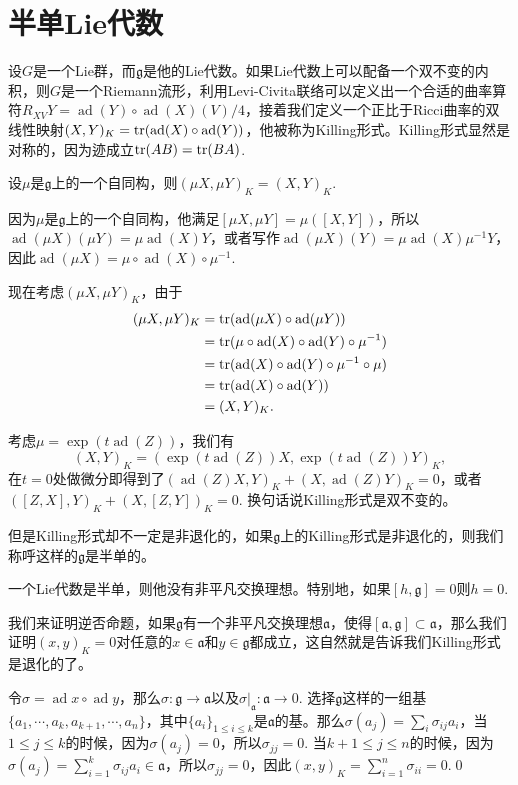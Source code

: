 \documentclass[9pt]{extarticle}
\newcommand{\lag}{{\mathfrak{g}}}
\DeclareMathOperator{\ad}{ad}
\begin{document}
\section{半单Lie代数}

\para 设$G$是一个Lie群，而$\lag$是他的Lie代数。如果Lie代数上可以配备一个双不变的内积，则$G$是一个Riemann流形，利用Levi-Civita联络可以定义出一个合适的曲率算符$R_{XV}Y=\ad(Y)\circ \ad(X)(V)/4$，接着我们定义一个正比于Ricci曲率的双线性映射$(X,Y)_K=\tr(\ad(X)\circ \ad(Y))$，他被称为Killing形式。Killing形式显然是对称的，因为迹成立$\operatorname{tr}(AB)=\operatorname{tr}(BA)$.

\para 设$\mu$是$\lag$上的一个自同构，则$(\mu X,\mu Y)_K=(X,Y)_K$.

因为$\mu$是$\lag$上的一个自同构，他满足$[\mu X,\mu Y]=\mu([X,Y])$，所以$\ad(\mu X)(\mu Y)=\mu\ad(X)Y$，或者写作$\ad(\mu X)(Y)=\mu\ad(X)\mu^{-1}Y$，因此$\ad(\mu X)=\mu\circ \ad(X)\circ \mu^{-1}$. 

现在考虑$(\mu X,\mu Y)_K$，由于
\begin{align*}
	(\mu X,\mu Y)_K&=\tr(\ad(\mu X)\circ \ad(\mu Y))\\
	&=\tr(\mu\circ \ad(X)\circ \ad(Y)\circ \mu^{-1})\\&=\tr(\ad(X)\circ \ad(Y)\circ \mu^{-1}\circ \mu)\\&=\tr(\ad(X)\circ \ad(Y))\\&=(X,Y)_K.
\end{align*}

考虑$\mu=\exp(t\ad(Z))$，我们有
\[
	(X,Y)_K=(\exp(t\ad(Z))X,\exp(t\ad(Z))Y)_K,
\]
在$t=0$处做微分即得到了$(\ad(Z)X,Y)_K+(X,\ad(Z)Y)_K=0$，或者$([Z,X],Y)_K+(X,[Z,Y])_K=0$. 换句话说Killing形式是双不变的。

但是Killing形式却不一定是非退化的，如果$\lag$上的Killing形式是非退化的，则我们称呼这样的$\lag$是半单的。

\pro 一个Lie代数是半单，则他没有非平凡交换理想。特别地，如果$[h,\lag]=0$则$h=0$.

\proof 我们来证明逆否命题，如果$\lag$有一个非平凡交换理想$\mathfrak{a}$，使得$[\mathfrak{a},\lag]\subset \mathfrak{a}$，那么我们证明$(x,y)_K=0$对任意的$x\in \mathfrak{a}$和$y\in \lag$都成立，这自然就是告诉我们Killing形式是退化的了。

令$\sigma=\ad x\circ \ad y$，那么$\sigma:\lag\to \mathfrak{a}$以及$\sigma|_\mathfrak{a}:\mathfrak{a}\to 0$. 选择$\lag$这样的一组基$\{a_1,\cdots,a_k,a_{k+1},\cdots,a_{n}\}$，其中$\{a_i\}_{1\leq i \leq k}$是$\mathfrak{a}$的基。那么$\sigma(a_j)=\sum_i\sigma_{ij} a_i$，当$1\leq j\leq k$的时候，因为$\sigma(a_j)=0$，所以$\sigma_{jj}=0$. 当$k+1\leq j \leq n$的时候，因为$\sigma(a_j)=\sum_{i=1}^k\sigma_{ij} a_i\in\mathfrak{a}$，所以$\sigma_{jj}=0$，因此$(x,y)_K=\sum_{i=1}^n\sigma_{ii}=0$.\qed
\end{document}
